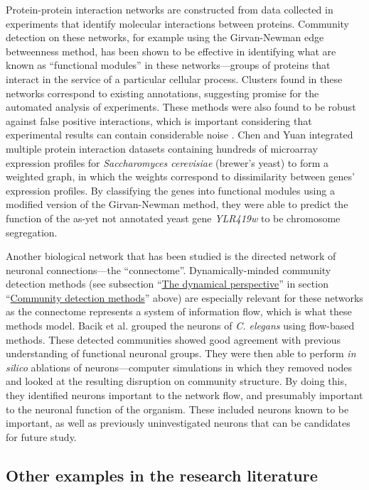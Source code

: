 Protein-protein interaction networks are constructed from data collected
in experiments that identify molecular interactions between proteins.
Community detection on these networks, for example using the
Girvan-Newman edge betweenness method, has been shown to be effective in
identifying what are known as ``functional modules'' in these
networks---groups of proteins that interact in the service of a
particular cellular process. Clusters found in these networks correspond
to existing annotations, suggesting promise for the automated analysis
of experiments. These methods were also found to be robust against false
positive interactions, which is important considering that experimental
results can contain considerable noise \autocite{dunn_use_2005}. Chen
and Yuan \autocite{chen_detecting_2006} integrated multiple protein
interaction datasets containing hundreds of microarray expression
profiles for \emph{Saccharomyces cerevisiae} (brewer's yeast) to form a
weighted graph, in which the weights correspond to dissimilarity between
genes' expression profiles. By classifying the genes into functional
modules using a modified version of the Girvan-Newman method, they were
able to predict the function of the as-yet not annotated yeast gene
\emph{YLR419w} to be chromosome segregation.

Another biological network that has been studied is the directed network
of neuronal connections---the ``connectome''. Dynamically-minded
community detection methods (see subsection
``\protect\hyperlink{the-dynamical-perspective}{The dynamical
perspective}'' in section
``\protect\hyperlink{community-detection-methods}{Community detection
methods}'' above) are especially relevant for these networks as the
connectome represents a system of information flow, which is what these
methods model. Bacik et al. \autocite{bacik_flow-based_2016} grouped the
neurons of \emph{C. elegans} using flow-based methods. These detected
communities showed good agreement with previous understanding of
functional neuronal groups. They were then able to perform \emph{in
silico} ablations of neurons---computer simulations in which they
removed nodes and looked at the resulting disruption on community
structure. By doing this, they identified neurons important to the
network flow, and presumably important to the neuronal function of the
organism. These included neurons known to be important, as well as
previously uninvestigated neurons that can be candidates for future
study.

\hypertarget{other-research}{\subsection{Other examples in the research
literature}\label{other-research}}

